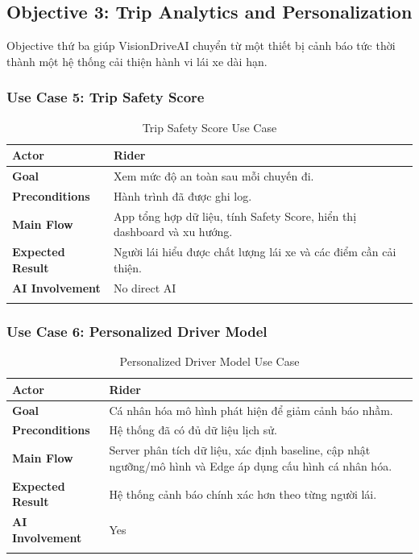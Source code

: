 \documentclass[12pt,a4paper]{article}
\begin{document}
\subsection{Objective 3: Trip Analytics and Personalization}

Objective thứ ba giúp VisionDriveAI chuyển từ một thiết bị cảnh báo tức thời thành một hệ thống cải thiện hành vi lái xe dài hạn.

\subsubsection{Use Case 5: Trip Safety Score}

\begin{longtable}{|P{3.5cm}|P{11cm}|}
\hline
\textbf{Actor} & Rider \\
\hline
\textbf{Goal} & Xem mức độ an toàn sau mỗi chuyến đi. \\
\hline
\textbf{Preconditions} & Hành trình đã được ghi log. \\
\hline
\textbf{Main Flow} & App tổng hợp dữ liệu, tính Safety Score, hiển thị dashboard và xu hướng. \\
\hline
\textbf{Expected Result} & Người lái hiểu được chất lượng lái xe và các điểm cần cải thiện. \\
\hline
\textbf{AI Involvement} & No direct AI \\
\hline
\caption{Trip Safety Score Use Case}
\end{longtable}

\subsubsection{Use Case 6: Personalized Driver Model}

\begin{longtable}{|P{3.5cm}|P{11cm}|}
\hline
\textbf{Actor} & Rider \\
\hline
\textbf{Goal} & Cá nhân hóa mô hình phát hiện để giảm cảnh báo nhầm. \\
\hline
\textbf{Preconditions} & Hệ thống đã có đủ dữ liệu lịch sử. \\
\hline
\textbf{Main Flow} & Server phân tích dữ liệu, xác định baseline, cập nhật ngưỡng/mô hình và Edge áp dụng cấu hình cá nhân hóa. \\
\hline
\textbf{Expected Result} & Hệ thống cảnh báo chính xác hơn theo từng người lái. \\
\hline
\textbf{AI Involvement} & Yes \\
\hline
\caption{Personalized Driver Model Use Case}
\end{longtable}
\end{document}

